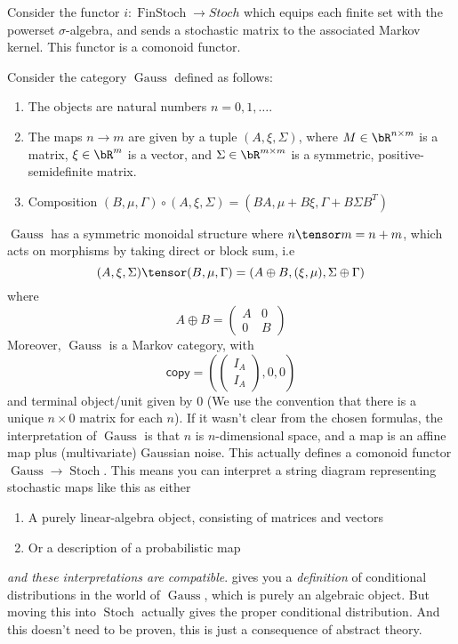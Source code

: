 \documentclass{article}
\newcommand{\cop}{\mathsf{copy}}
\DeclareMathOperator{\Stoch}{Stoch}
\DeclareMathOperator{\Gauss}{Gauss}
\DeclareMathOperator{\FinStoch}{FinStoch}
\begin{document}
\begin{example}
    Consider the functor $i: \FinStoch \to Stoch$ which equips each finite set with the powerset $\sigma$-algebra, and sends a stochastic matrix to the associated Markov kernel.
    This functor is a comonoid functor.
\end{example}
\begin{example}
    Consider the category $\Gauss$ defined as follows:
    \begin{enumerate}
        \item The objects are natural numbers $n= 0, 1, \dots$.
        \item The maps $n \to m$ are given by a tuple $(A, \xi, \Sigma)$, where $M \in \bR^{n \times m}$ is a matrix, $\xi \in \bR^m$ is a vector, and $\Sigma \in \bR^{m \times m}$ is a symmetric, positive-semidefinite matrix.
        \item Composition $(B,\mu,\Gamma) \circ (A,\xi,\Sigma) = (BA, \mu + B\xi, \Gamma + B\Sigma B^T)$
    \end{enumerate}
    $\Gauss$ has a symmetric monoidal structure where $n \tensor m = n + m$, which acts on morphisms by taking direct or block sum, i.e
    \[(A,\xi,\Sigma) \tensor (B,\mu,\Gamma) = (A \oplus B, (\xi,\mu), \Sigma \oplus \Gamma)\]
where \[A \oplus B = \begin{pmatrix}A & 0 \\ 0 & B\end{pmatrix}\]
    Moreover, $\Gauss$ is a Markov category, with
\[\cop = \left(\begin{pmatrix}I_A\\I_A\end{pmatrix}, 0, 0\right)\]
    and terminal object/unit given by $0$ (We use the convention that there is a unique $n \times 0$ matrix for each $n$).
    If it wasn't clear from the chosen formulas, the interpretation of $\Gauss$ is that $n$ is $n$-dimensional space, and a map is an affine map plus (multivariate) Gaussian noise.
    This actually defines a comonoid functor $\Gauss \to \Stoch$.
    This means you can interpret a string diagram representing stochastic maps like this as either
    \begin{enumerate}
        \item A purely linear-algebra object, consisting of matrices and vectors
        \item Or a description of a probabilistic map
    \end{enumerate}
    \emph{and these interpretations are compatible}.
     gives you a \emph{definition} of conditional distributions in the world of $\Gauss$, which is purely an algebraic object.
    But moving this into $\Stoch$ actually gives the proper conditional distribution.
    And this doesn't need to be proven, this is just a consequence of abstract theory.
\end{example}
\end{document}
